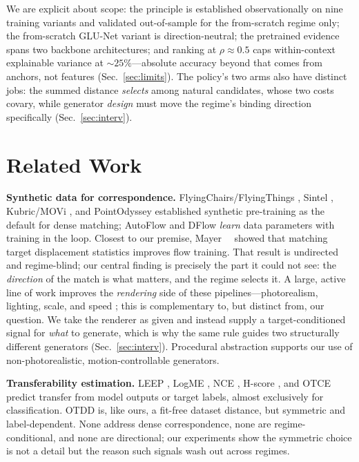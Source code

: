 \documentclass[runningheads]{llncs}
\begin{document}
We are explicit about scope: the principle is established observationally on
nine training variants and validated out-of-sample for the from-scratch
regime only; the from-scratch GLU-Net variant is direction-neutral; the
pretrained evidence spans two backbone architectures; and ranking at
$\rho{\approx}0.5$ caps within-context explainable variance at
${\sim}25\%$---absolute accuracy beyond that comes from anchors, not
features (Sec.~\ref{sec:limits}). The policy's two arms also have distinct
jobs: the summed distance \emph{selects} among natural candidates, whose two
costs covary, while generator \emph{design} must move the regime's binding
direction specifically (Sec.~\ref{sec:interv}).

\section{Related Work}
\label{sec:related}

\noindent\textbf{Synthetic data for correspondence.}
FlyingChairs/FlyingThings \cite{mayer2016FlyingThingsDataset}, Sintel
\cite{sintel}, Kubric/MOVi \cite{greff2021kubric}, and PointOdyssey
\cite{pointodyssey} established synthetic pre-training as the default for
dense matching; AutoFlow \cite{sun2021autoflow} and DFlow \cite{im2022dflow}
\emph{learn} data parameters with training in the loop. Closest to our
premise, Mayer~\etal~\cite{mayer2018what} showed that matching target
displacement statistics improves flow training. That result is undirected and
regime-blind; our central finding is precisely the part it could not see: the
\emph{direction} of the match is what matters, and the regime selects it.
A large, active line of work improves the \emph{rendering} side of these
pipelines---photorealism, lighting, scale, and speed
\cite{greff2021kubric,pointodyssey}; this is complementary to, but distinct
from, our question. We take the renderer as given and instead supply a
target-conditioned signal for \emph{what} to generate, which is why the same
rule guides two structurally different generators (Sec.~\ref{sec:interv}).
Procedural abstraction \cite{Baradad2021LookingAtNoise,white2009mandelbulb}
supports our use of non-photorealistic, motion-controllable generators.

\noindent\textbf{Transferability estimation.}
LEEP \cite{nguyen2020leep}, LogME \cite{you2021logme}, NCE
\cite{tran2019transferability}, H-score \cite{bao2019information}, and OTCE
\cite{tan2021otce} predict transfer from model outputs or target labels,
almost exclusively for classification. OTDD \cite{alvarez2020geometric} is,
like ours, a fit-free dataset distance, but symmetric and label-dependent.
None address dense correspondence, none are regime-conditional, and none are
directional; our experiments show the symmetric choice is not a detail but
the reason such signals wash out across regimes.
\end{document}
